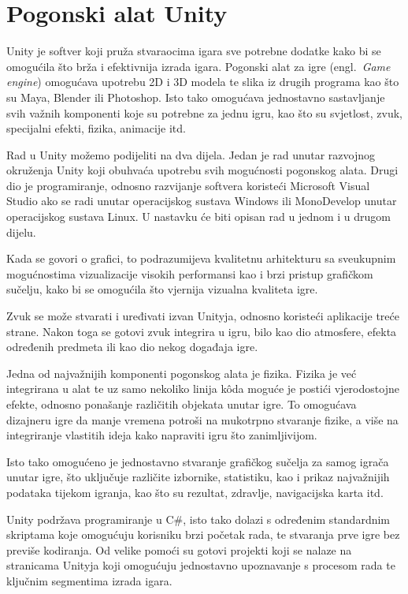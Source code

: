 \section{Pogonski alat Unity}
Unity je softver koji pruža stvaraocima igara sve potrebne dodatke kako bi se omogućila što brža i efektivnija izrada igara.
Pogonski alat za igre (engl.~\textit{Game engine}) omogućava upotrebu 2D i 3D modela te slika iz drugih programa kao što su Maya, Blender ili Photoshop.
Isto tako omogućava jednostavno sastavljanje svih važnih komponenti koje su potrebne za jednu igru, kao što su svjetlost, zvuk, specijalni efekti, fizika, animacije itd.

Rad u Unity možemo podijeliti na dva dijela. Jedan je rad unutar razvojnog okruženja Unity koji obuhvaća upotrebu svih mogućnosti pogonskog alata. Drugi dio je programiranje, odnosno razvijanje softvera koristeći Microsoft Visual Studio ako se radi unutar operacijskog sustava Windows ili MonoDevelop unutar operacijskog sustava Linux.
U nastavku će biti opisan rad u jednom i u drugom dijelu.

Kada se govori o grafici, to podrazumijeva kvalitetnu arhitekturu sa sveukupnim mogućnostima vizualizacije visokih performansi kao i brzi pristup grafičkom sučelju, kako bi se omogućila što vjernija vizualna kvaliteta igre.

Zvuk se može stvarati i uređivati izvan Unityja, odnosno koristeći aplikacije treće strane. Nakon toga se gotovi zvuk integrira u igru, bilo kao dio atmosfere, efekta određenih predmeta ili kao dio nekog događaja igre.

Jedna od najvažnijih komponenti pogonskog alata je fizika. Fizika je već integrirana u alat te uz samo nekoliko linija k\^oda moguće je postići vjerodostojne efekte, odnosno ponašanje različitih objekata unutar igre. To omogućava dizajneru igre da manje vremena potroši na mukotrpno stvaranje fizike, a više na integriranje vlastitih ideja kako napraviti igru što zanimljivijom.

Isto tako omogućeno je jednostavno stvaranje grafičkog sučelja za samog igrača unutar igre, što uključuje različite izbornike, statistiku, kao i prikaz najvažnijih podataka tijekom igranja, kao što su rezultat, zdravlje, navigacijska karta itd.

Unity podržava programiranje u C\#, isto tako dolazi s određenim standardnim skriptama koje omogućuju korisniku brzi početak rada, te stvaranja prve igre bez previše kodiranja. Od velike pomoći su gotovi projekti koji se nalaze na stranicama Unityja koji omogućuju jednostavno upoznavanje s procesom rada te ključnim segmentima izrada igara.

